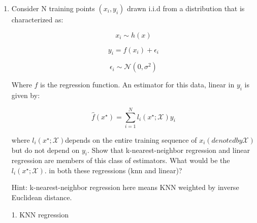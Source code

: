 \begin{enumerate}
    The loss function becomes $L=(\mathbf{X}\mathbf{w}-Y)^{T}(\mathbf{X}\mathbf{w}-Y)+\lambda\mathbf{w}^{T}\mathbf{w}$

    First we take the derivative of the objective function with respect to w and set it to zero, arriving at equation (???). 

    Finally, we arrive at the solution $\mathbf{w}=(\mathbf{X}^{T}\mathbf{X}+\lambda I)^{-1}\mathbf{X}^{T}Y$

    What should equation (???) be?\\
    (a) $(\mathbf{X}\mathbf{w}-Y)^{T}\mathbf{X}+\lambda\mathbf{w}=0$\\
    \begin{soln}
    (b) $(\mathbf{X}\mathbf{w}-Y)^{T}\mathbf{X}+\lambda\mathbf{w}^{T}=0$\\
    \end{soln}
    (c) $(\mathbf{X}\mathbf{w}-Y)^{T}\mathbf{X}+\lambda\mathbf{w}^{T}\mathbf{X}^{T}=0$\\
    (d) $(\mathbf{X}\mathbf{w}-Y)^{T}\mathbf{X}+2\lambda\mathbf{w}=0$\\
    \begin{qauthor}
    Yu Huang
    \end{qauthor}
    
    
    \item Consider N training points $(x_{i},y_{i})$ drawn i.i.d from a distribution that is characterized as:

    $$x_{i}\sim h(x)$$ 
    
    $$y_{i}=f(x_{i})+\epsilon_{i}$$
    
    $$\epsilon_{i}\sim\mathcal{N}(0,\sigma^{2})$$
    
    Where $f$ is the regression function. An estimator for this data, linear in $y_{i}$ is given by:
    
    $$\hat{f}(x^{\star})=\sum_{i=1}^{N}l_{i}(x^{\star};\mathcal{X})y_{i}$$
    
    where $l_{i}(x^{\star};\mathcal{X})$depends on the entire training sequence of $x_{i}(denoted by \mathcal{X})$ but do not depend on $y_{i}$. Show that k-nearest-neighbor regression and linear regression are members of this class of estimators. What would be the $l_{i}(x^{\star};\mathcal{X})$. in both these regressions (knn and linear)?
    
    Hint: k-nearest-neighbor regression here means KNN weighted by inverse Euclidean distance. 
    
    \begin{soln}
    1. KNN regression


\end{soln}
\end{enumerate}
